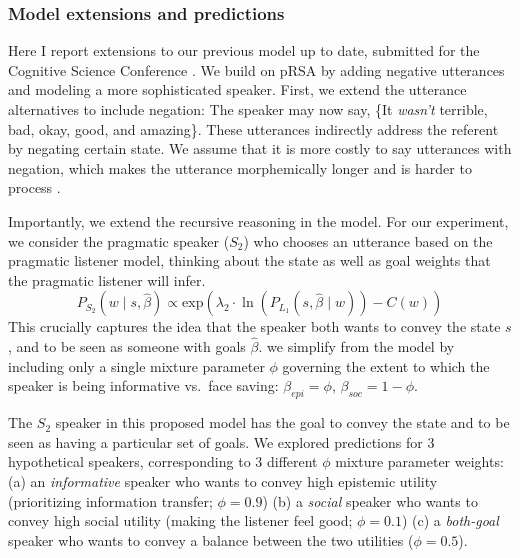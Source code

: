 \subsubsection{Model extensions and predictions} 

Here I report extensions to our previous model up to date, 
submitted for the Cognitive Science Conference \citep{yoon2017}. 
We build on pRSA by adding negative utterances and modeling a more
sophisticated speaker. First, we extend the utterance alternatives to
include negation: The speaker may now say, \{It \emph{wasn't} terrible, bad,
okay, good, and amazing\}. These utterances indirectly address the
referent by negating certain state. We assume that it is more costly to
say utterances with negation, which makes the utterance morphemically
longer and is harder to process \citep{clark1972}. 
%

Importantly, we extend the recursive reasoning in the model. For
our experiment, we consider the pragmatic speaker (\(S_2\)) who chooses
an utterance based on the pragmatic listener model, 
thinking about the state as well as goal weights that the pragmatic
listener will infer.
\[P_{S_2}(w \mid s, \hat{\beta})\propto \mathrm{exp}(\lambda_{2} \cdot \ln(P_{L_1}(s,  \hat{\beta} \mid w)) - C(w))\]
This crucially captures the idea that the speaker both wants to convey
the state \(s\), and to be seen as someone with goals \(\hat{\beta}\).
we simplify from the \citet{yoon2016} model by including only a single
mixture parameter \(\phi\) governing the extent to which the speaker is
being informative vs.~face saving: \(\beta_{epi} = \phi\),
\(\beta_{soc} = 1 - \phi\).

The \(S_2\) speaker in this proposed model has the goal to convey the state and to
be seen as having a particular set of goals. We explored predictions for
3 hypothetical speakers, corresponding to 3 different \(\phi\) mixture
parameter weights: (a) an \emph{informative} speaker who wants to convey
high epistemic utility (prioritizing information transfer;
\(\phi = 0.9\)) (b) a \emph{social} speaker who wants to convey high
social utility (making the listener feel good; \(\phi = 0.1\)) (c) a
\emph{both-goal} speaker who wants to convey a balance between the two
utilities (\(\phi = 0.5\)).

